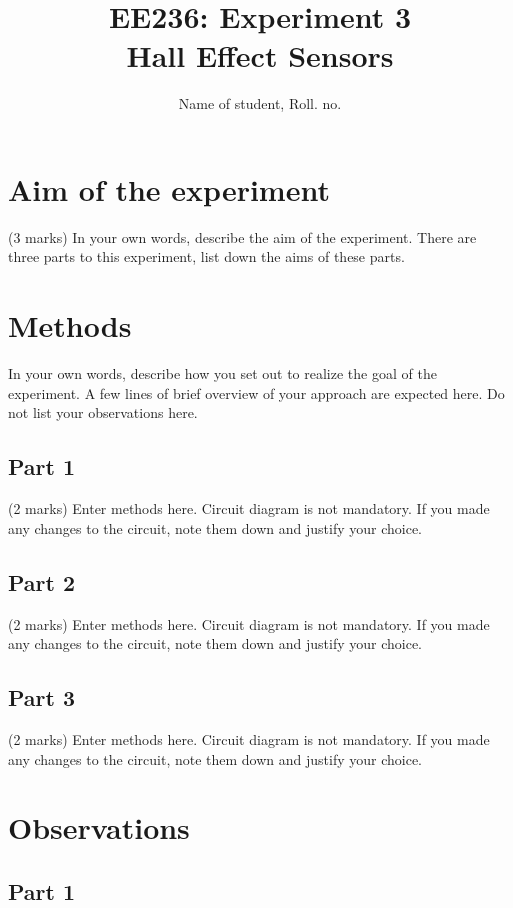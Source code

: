 \documentclass[12pt]{article}
\title{EE236: Experiment 3\\
Hall Effect Sensors}
\author{Name of student, Roll. no.}
\begin{document}
\maketitle

\section{Aim of the experiment}

(3 marks) In your own words, describe the aim of the experiment. There are three parts to this experiment, list down the aims of these parts.

\section{Methods}

In your own words, describe how you set out to realize the goal of the experiment. A few lines of brief overview of your approach are expected here. Do not list your observations here.

\subsection{Part 1}

(2 marks) Enter methods here. Circuit diagram is not mandatory. If you made any changes to the circuit, note them down and justify your choice.

\subsection{Part 2}

(2 marks) Enter methods here. Circuit diagram is not mandatory. If you made any changes to the circuit, note them down and justify your choice. 

\subsection{Part 3}

(2 marks) Enter methods here. Circuit diagram is not mandatory. If you made any changes to the circuit, note them down and justify your choice.

\section{Observations}

\subsection{Part 1}
\end{document}
